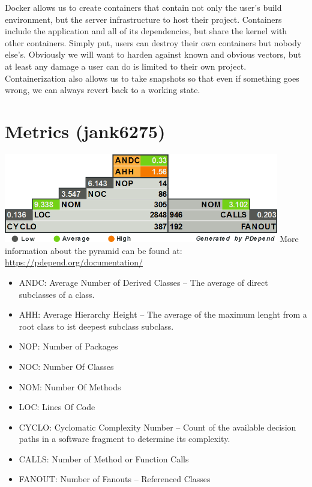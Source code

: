 \documentclass[11pt]{report}
\begin{document}
    Docker allows us to create containers that contain not only the user's build environment, but the server infrastructure to host their project. Containers include the application and all of its dependencies, but share the kernel with other containers. Simply put, users can destroy their own containers but nobody else’s. Obviously we will want to harden against known and obvious vectors, but at least any damage a user can do is limited to their own project. Containerization also allows us to take snapshots so that even if something goes wrong, we can always revert back to a working state.


\chapter{Metrics (jank6275)}

\includegraphics[width=0.9\textwidth]{metrics/stats}
More information about the pyramid can be found at: \url{https://pdepend.org/documentation/}
\begin{itemize}
    \item ANDC: Average Number of Derived Classes -- The average of direct subclasses of a class.
    \item AHH: Average Hierarchy Height -- The average of the maximum lenght from a root class to ist deepest subclass subclass.
    \item NOP: Number of Packages
    \item NOC: Number Of Classes
    \item NOM: Number Of Methods
    \item LOC: Lines Of Code
    \item CYCLO: Cyclomatic Complexity Number -- Count of the available decision paths in a software fragment to determine its complexity.
    \item CALLS: Number of Method or Function Calls
    \item FANOUT: Number of Fanouts -- Referenced Classes
\end{itemize}
\end{document}
